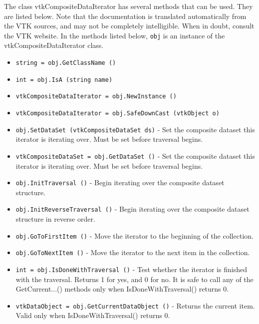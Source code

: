The class vtkCompositeDataIterator has several methods that can be used.
  They are listed below.
Note that the documentation is translated automatically from the VTK sources,
and may not be completely intelligible.  When in doubt, consult the VTK website.
In the methods listed below, \verb|obj| is an instance of the vtkCompositeDataIterator class.
\begin{itemize}
\item  \verb|string = obj.GetClassName ()|

\item  \verb|int = obj.IsA (string name)|

\item  \verb|vtkCompositeDataIterator = obj.NewInstance ()|

\item  \verb|vtkCompositeDataIterator = obj.SafeDownCast (vtkObject o)|

\item  \verb|obj.SetDataSet (vtkCompositeDataSet ds)| -  Set the composite dataset this iterator is iterating over. 
 Must be set before traversal begins.

\item  \verb|vtkCompositeDataSet = obj.GetDataSet ()| -  Set the composite dataset this iterator is iterating over. 
 Must be set before traversal begins.

\item  \verb|obj.InitTraversal ()| -  Begin iterating over the composite dataset structure.

\item  \verb|obj.InitReverseTraversal ()| -  Begin iterating over the composite dataset structure in reverse order.

\item  \verb|obj.GoToFirstItem ()| -  Move the iterator to the beginning of the collection.

\item  \verb|obj.GoToNextItem ()| -  Move the iterator to the next item in the collection.

\item  \verb|int = obj.IsDoneWithTraversal ()| -  Test whether the iterator is finished with the traversal.
 Returns 1 for yes, and 0 for no. 
 It is safe to call any of the GetCurrent...() methods only when
 IsDoneWithTraversal() returns 0.

\item  \verb|vtkDataObject = obj.GetCurrentDataObject ()| -  Returns the current item. Valid only when IsDoneWithTraversal() returns 0.


\end{itemize}

